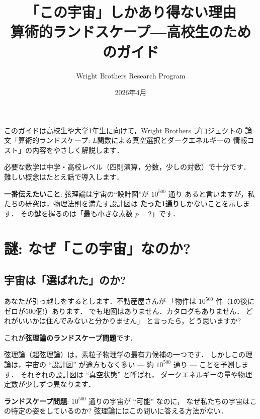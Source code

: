 \documentclass[11pt,a4paper]{article}
\title{「この宇宙」しかあり得ない理由\\
\large 算術的ランドスケープ---高校生のためのガイド}
\author{Wright Brothers Research Program}
\date{2026年4月}
\begin{document}
\maketitle

\begin{tcolorbox}[colback=yellow!5,colframe=orange!60!black,title=このガイドについて]
このガイドは高校生や大学1年生に向けて，Wright Brothers プロジェクトの
論文「算術的ランドスケープ: $L$関数による真空選択とダークエネルギーの
情報コスト」の内容をやさしく解説します．

必要な数学は中学・高校レベル（四則演算，分数，少しの対数）で十分です．
難しい概念はたとえ話で導入します．

\textbf{一番伝えたいこと}: 弦理論は宇宙の``設計図''が $10^{500}$ 通り
あると言いますが，私たちの研究は，物理法則を満たす設計図は
\textbf{たった1通り}しかないことを示します．
その鍵を握るのは「最も小さな素数 $p=2$」です．
\end{tcolorbox}

\tableofcontents

\newpage

\section{謎: なぜ「この宇宙」なのか?}

\subsection{宇宙は「選ばれた」のか?}

あなたが引っ越しをするとします．不動産屋さんが
「物件は $10^{500}$ 件（1の後にゼロが500個!）あります．
でも地図はありません．カタログもありません．
どれがいいかは住んでみないと分かりません」
と言ったら，どう思いますか?

これが\textbf{弦理論のランドスケープ問題}です．

弦理論（超弦理論）は，素粒子物理学の最有力候補の一つです．
しかしこの理論は，宇宙の ``設計図'' が途方もなく多い
--- 約 $10^{500}$ 通り --- ことを予測します．
それぞれの設計図は ``真空状態'' と呼ばれ，
ダークエネルギーの量や物理定数が少しずつ異なります．

\begin{tcolorbox}[colback=red!5,colframe=red!50!black]
\textbf{ランドスケープ問題}: $10^{500}$ 通りの宇宙が ``可能'' なのに，
なぜ私たちの宇宙はこの特定の姿をしているのか?
弦理論にはこの問いに答える方法がない．
\end{tcolorbox}
\end{document}
